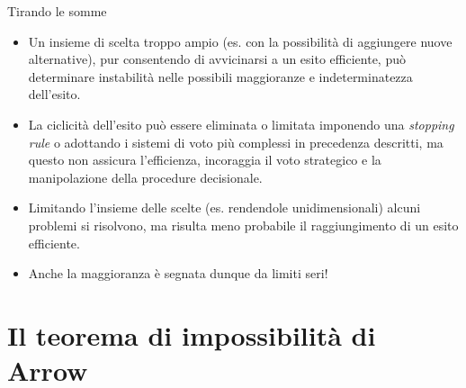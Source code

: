 \documentclass[aspectratio=64,11pt]{beamer}
\begin{document}
\begin{frame}{Tirando le somme}
\begin{itemize}
\item Un insieme di scelta troppo ampio (es. con la possibilità di aggiungere
nuove alternative), pur consentendo di avvicinarsi a un esito efficiente,
può determinare instabilità nelle possibili maggioranze e indeterminatezza
dell'esito.
\item La ciclicità dell'esito può essere eliminata o limitata imponendo una
\emph{stopping rule} o adottando i sistemi di voto più complessi in precedenza
descritti, ma questo non assicura l'efficienza, incoraggia il voto
strategico e la manipolazione della procedure decisionale.
\item Limitando l'insieme delle scelte (es. rendendole unidimensionali) alcuni
problemi si risolvono, ma risulta meno probabile il raggiungimento di un
esito efficiente.
\item Anche la maggioranza è segnata dunque da limiti seri!
\end{itemize}
\end{frame}

\section{Il teorema di impossibilità di Arrow}
\end{document}
